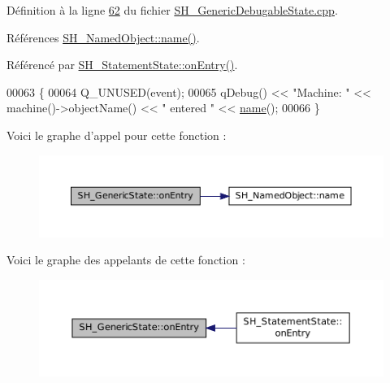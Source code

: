Définition à la ligne \hyperlink{SH__GenericDebugableState_8cpp_source_l00062}{62} du fichier \hyperlink{SH__GenericDebugableState_8cpp_source}{S\-H\-\_\-\-Generic\-Debugable\-State.\-cpp}.



Références \hyperlink{classSH__NamedObject_a970f265df31b28b2179bbbceb6170ac2}{S\-H\-\_\-\-Named\-Object\-::name()}.



Référencé par \hyperlink{classSH__StatementState_ac62f9c27b2966034e56762a6e532dbe4}{S\-H\-\_\-\-Statement\-State\-::on\-Entry()}.


\begin{DoxyCode}
00063 \{
00064     Q\_UNUSED(event);
00065     qDebug() << \textcolor{stringliteral}{"Machine: "} << machine()->objectName() << \textcolor{stringliteral}{" entered "} << \hyperlink{classSH__NamedObject_a970f265df31b28b2179bbbceb6170ac2}{name}();
00066 \}
\end{DoxyCode}


Voici le graphe d'appel pour cette fonction \-:
\nopagebreak
\begin{figure}[H]
\begin{center}
\leavevmode
\includegraphics[width=350pt]{classSH__GenericState_a7c30692635023ce7cf65e5ba5bb18a9c_cgraph}
\end{center}
\end{figure}




Voici le graphe des appelants de cette fonction \-:
\nopagebreak
\begin{figure}[H]
\begin{center}
\leavevmode
\includegraphics[width=350pt]{classSH__GenericState_a7c30692635023ce7cf65e5ba5bb18a9c_icgraph}
\end{center}
\end{figure}


